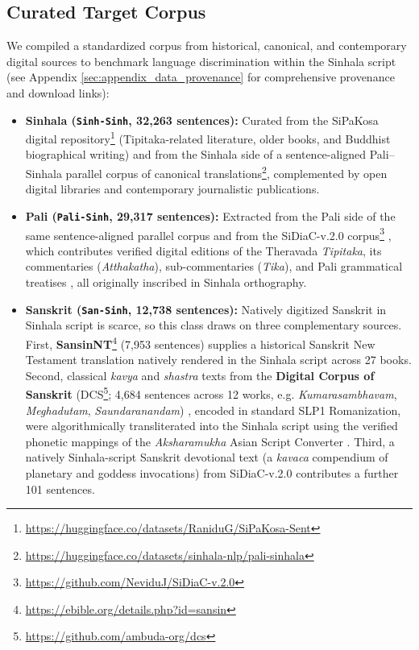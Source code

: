 \documentclass[11pt]{article}
\begin{document}
\subsection{Curated Target Corpus}
We compiled a standardized corpus from historical, canonical, and contemporary digital sources to benchmark language discrimination within the Sinhala script (see Appendix \ref{sec:appendix_data_provenance} for comprehensive provenance and download links):
\begin{itemize}
    \item \textbf{Sinhala (\texttt{Sinh-Sinh}, 32,263 sentences):} Curated from the SiPaKosa digital repository\footnote{\url{https://huggingface.co/datasets/RaniduG/SiPaKosa-Sent}} (Tipitaka-related literature, older books, and Buddhist biographical writing) and from the Sinhala side of a sentence-aligned Pali--Sinhala parallel corpus of canonical translations\footnote{\url{https://huggingface.co/datasets/sinhala-nlp/pali-sinhala}}, complemented by open digital libraries and contemporary journalistic publications.
    \item \textbf{Pali (\texttt{Pali-Sinh}, 29,317 sentences):} Extracted from the Pali side of the same sentence-aligned parallel corpus and from the SiDiaC-v.2.0 corpus\footnote{\url{https://github.com/NeviduJ/SiDiaC-v.2.0}} \cite{welgama2021sidiac}, which contributes verified digital editions of the Theravada \textit{Tipitaka}, its commentaries (\textit{Atthakatha}), sub-commentaries (\textit{Tika}), and Pali grammatical treatises \cite{norman1983pali}, all originally inscribed in Sinhala orthography.
    \item \textbf{Sanskrit (\texttt{San-Sinh}, 12,738 sentences):} Natively digitized Sanskrit in Sinhala script is scarce, so this class draws on three complementary sources. First, \textbf{SansinNT}\footnote{\url{https://ebible.org/details.php?id=sansin}} (7,953 sentences) supplies a historical Sanskrit New Testament translation natively rendered in the Sinhala script across 27 books. Second, classical \textit{kavya} and \textit{shastra} texts from the \textbf{Digital Corpus of Sanskrit} (DCS\footnote{\url{https://github.com/ambuda-org/dcs}}; 4,684 sentences across 12 works, e.g. \textit{Kumarasambhavam}, \textit{Meghadutam}, \textit{Saundaranandam}) \cite{hellwig2010dcs}, encoded in standard SLP1 Romanization, were algorithmically transliterated into the Sinhala script using the verified phonetic mappings of the \textit{Aksharamukha} Asian Script Converter \cite{rajan2023aksharamukha}. Third, a natively Sinhala-script Sanskrit devotional text (a \textit{kavaca} compendium of planetary and goddess invocations) from SiDiaC-v.2.0 \cite{welgama2021sidiac} contributes a further 101 sentences.
\end{itemize}
\end{document}
